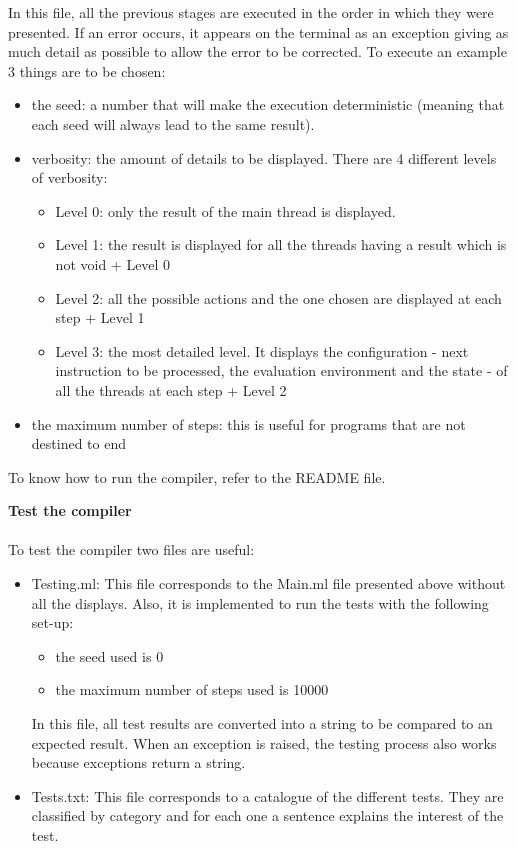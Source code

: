 \documentclass[11pt]{report}
\begin{document}
In this file, all the previous stages are executed in the order in which they were presented. If an error occurs, it appears on the terminal as an exception giving as much detail as possible to allow the error to be corrected. 
To execute an example 3 things are to be chosen:
\begin{itemize}
\item the seed: a number that will make the execution deterministic (meaning that each seed will always lead to the same result).
\item verbosity: the amount of details to be displayed. There are 4 different levels of verbosity:
    \begin{itemize}
        \item Level 0: only the result of the main thread is displayed. 
        \item Level 1: the result is displayed for all the threads having a result which is not void + Level 0 
        \item Level 2: all the possible actions and the one chosen are displayed at each step + Level 1
        \item Level 3: the most detailed level. It displays the configuration - next instruction to be processed, the evaluation environment and the state - of all the threads at each step + Level 2
        \end{itemize}
\item the maximum number of steps: this is useful for programs that are not destined to end
\end{itemize}

To know how to run the compiler, refer to the README file.

{}
\tabto{0cm} {\LARGE \textbf{Test the compiler}}
\\ \\
To test the compiler two files are useful:
\begin{itemize}
\item Testing.ml: This file corresponds to the Main.ml file presented above without all the displays. Also, it is implemented to run the tests with the following set-up:
\begin{itemize}
    \item the seed used is 0
    \item the maximum number of steps used is 10000
\end{itemize}
In this file, all test results are converted into a string to be compared to an expected result. When an exception is raised, the testing process also works because exceptions return a string.
\item Tests.txt: This file corresponds to a catalogue of the different tests. They are classified by category and for each one a sentence explains the interest of the test.
\end{itemize}
\end{document}
